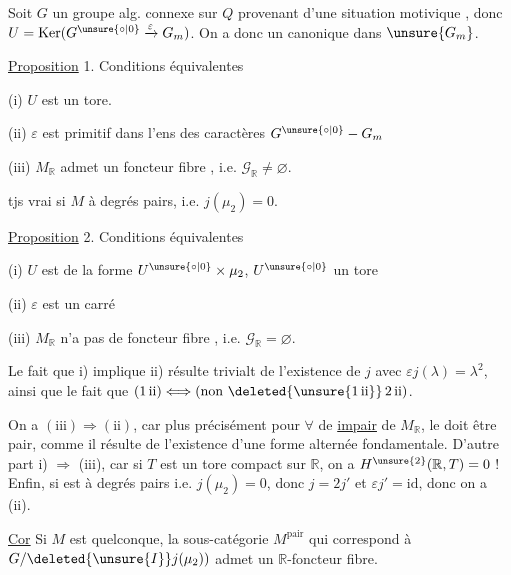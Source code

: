 Soit $G$ un groupe  alg. connexe sur $Q$ provenant d'une situation motivique , donc $U=\operatorname{Ker}(G^{\unsure{\circ|0}}\xrightarrow{\varepsilon}G_m)$. On a donc un  canonique dans $\unsure{G_m}$.


\uline{Proposition} 1. Conditions équivalentes

(i) $U$ est un tore.

(ii) $\varepsilon$ est primitif dans l'ens des caractères $G^{\unsure{\circ|0}}\mathbin{-}G_m$

(iii) $M_{\mathbb R}$ admet un foncteur fibre , i.e. $\mathscr G_{\mathbb R}\ne\varnothing$.

 tjs vrai si $M$ à degrés pairs, i.e. $j(\mu_2)=0$.

\uline{Proposition} 2. Conditions équivalentes

(i) $U$ est de la forme $U^{\unsure{\circ|0}}\times\mu_2$, $U^{\unsure{\circ|0}}$ un tore

(ii) $\varepsilon$ est  un carré 

(iii) $M_{\mathbb R}$ n'a pas de foncteur fibre , i.e. $\mathscr G_{\mathbb R}=\varnothing$.

Le fait que i) implique ii)  résulte trivialt de  l'existence de $j$ avec $\varepsilon j(\lambda)=\lambda^2$, ainsi que le fait que $(1\,\mathrm{ii})\Longleftrightarrow(\text{non }\deleted{\unsure{1\,\mathrm{ii}}}\,2\,\mathrm{ii})$.

On a $(\mathrm{iii})\Rightarrow(\mathrm{ii})$, car plus précisément pour $\forall$   de    \uline{impair} de $M_{\mathbb R}$, le   doit être pair, comme il résulte de l'existence d'une forme alternée fondamentale. D'autre part i) $\Rightarrow$ (iii), car si $T$ est un tore compact sur $\mathbb R$, on a $H^{\unsure{2}}(\mathbb R,T)=0$ ! Enfin, si   est à degrés pairs i.e. $j(\mu_2)=0$, donc $j=2j'$ et $\varepsilon j'=\mathrm{id}$, donc on a (ii).

\uline{Cor} Si $M$ est quelconque, la sous-catégorie  $M^{\text{pair}}$   qui correspond à $G/\deleted{\unsure{I}}j(\mu_2))$  admet un $\mathbb R$-foncteur fibre.
